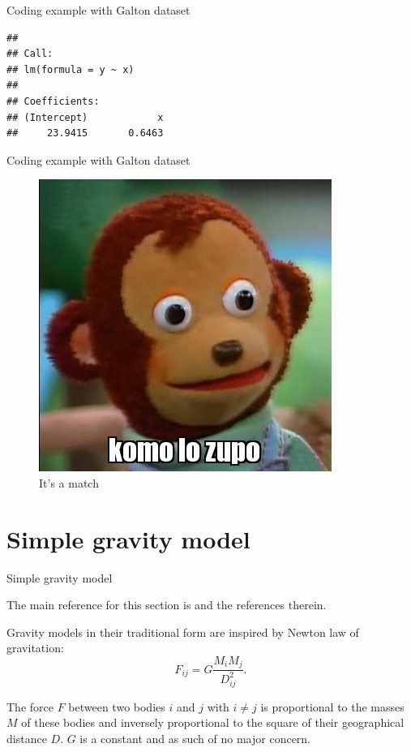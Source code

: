 \documentclass[ignorenonframetext,compress,aspectratio=169]{beamer}
\begin{document}
\begin{frame}[fragile]{Coding example with Galton dataset}

\begin{verbatim}
## 
## Call:
## lm(formula = y ~ x)
## 
## Coefficients:
## (Intercept)            x  
##     23.9415       0.6463
\end{verbatim}

\end{frame}

\begin{frame}{Coding example with Galton dataset}

\begin{figure}
\centering
\includegraphics{komolozupo.jpg}
\caption{It's a match}
\end{figure}

\end{frame}

\section{Simple gravity model}\label{simple-gravity-model}

\begin{frame}{Simple gravity model}

The main reference for this section is \citet{Woelver2018} and the
references therein.

Gravity models in their traditional form are inspired by Newton law of
gravitation: \[
F_{ij}=G\frac{M_{i}M_{j}}{D^{2}_{ij}}.
\]

The force \(F\) between two bodies \(i\) and \(j\) with \(i \neq j\) is
proportional to the masses \(M\) of these bodies and inversely
proportional to the square of their geographical distance \(D\). \(G\)
is a constant and as such of no major concern.

\end{frame}
\end{document}
